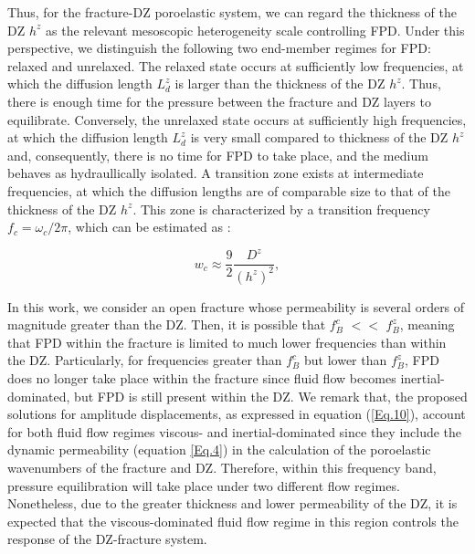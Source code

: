 \documentclass[draft]{agujournal2019}
\begin{document}
Thus, for the fracture-DZ poroelastic system, we can regard the thickness of the DZ $h^z$ as the relevant mesoscopic heterogeneity scale controlling FPD. Under this perspective, we  distinguish the following two end-member regimes for FPD: relaxed and unrelaxed. The relaxed state occurs at sufficiently low  frequencies, at which the diffusion length $L_d^z$ is larger than the thickness of the DZ $h^z$.
Thus, there is enough time for the pressure between the fracture and DZ layers to equilibrate. Conversely, the unrelaxed state occurs at sufficiently high frequencies, at which the diffusion length $L_d^z$ is very small compared to thickness of the DZ $h^z$ and, consequently, there is no time for FPD to take place, and the medium behaves as hydraullically isolated. A transition zone exists at intermediate frequencies, at which the diffusion lengths are of comparable size to that of the thickness of the DZ $h^z$. This zone is characterized by a transition frequency $f_c = \omega_c /2 \pi$, which can be estimated as \cite{Brajanovski2006, Muller2006}: 
\begin{linenomath*}
\begin{equation}\label{Eq.21}
   w_c \approx  \frac{9}{2} \frac{D^z}{(h^z)^2}  ,
\end{equation}
\end{linenomath*}

In this work, we consider an open fracture whose permeability is several orders of magnitude greater than the DZ. Then, it is possible that $f_B^c$ $<<$ $f_B^z$, meaning that FPD within the fracture is limited to much lower frequencies than within the DZ. Particularly, for frequencies greater than $f_B^c$ but lower than $f_B^z$, FPD does no longer take place within the fracture since fluid flow becomes inertial-dominated, but FPD is still present within the DZ.  We remark that, the proposed solutions for amplitude displacements, as expressed in equation (\ref{Eq.10}), account for both fluid flow regimes viscous- and inertial-dominated since they include the dynamic permeability (equation \ref{Eq.4}) in the calculation of the poroelastic wavenumbers  of the fracture and DZ. Therefore,
within this frequency band, pressure equilibration will take place under two different flow regimes. Nonetheless, due to the greater thickness and lower permeability of the DZ, it is expected that the viscous-dominated fluid flow regime in this region controls the response of the DZ-fracture system.
\end{document}

